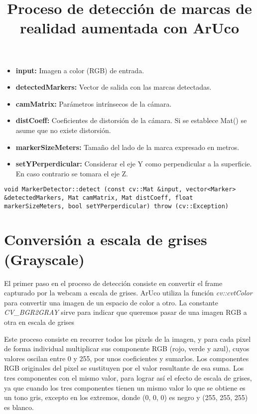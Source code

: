 \documentclass[10pt,a4paper]{article}
\begin{document}
\title{Proceso de detección de marcas de realidad aumentada con ArUco}
\author{}
\date{}
\maketitle


\begin{itemize}
\item \textbf{input:} Imagen a color (RGB) de entrada.
\item \textbf{detectedMarkers:} Vector de salida con las marcas detectadas.
\item \textbf{camMatrix:} Parámetros intrínsecos de la cámara.
\item \textbf{distCoeff:} Coeficientes de distorsión de la cámara. Si se establece Mat() se asume que no existe distorsión.
\item \textbf{markerSizeMeters:} Tamaño del lado de la  marca expresado en metros.
\item \textbf{setYPerperdicular:} Considerar el eje Y como perpendicular a la superficie. En caso contrario se tomara el eje Z.
\end{itemize}


\begin{lstlisting}[style=C++]
void MarkerDetector::detect (const cv::Mat &input, vector<Marker> &detectedMarkers, Mat camMatrix, Mat distCoeff, float markerSizeMeters, bool setYPerperdicular) throw (cv::Exception)
\end{lstlisting}

\section{Conversión a escala de grises (Grayscale)}
El primer paso en el proceso de detección consiste en convertir el frame capturado por la webcam a escala de grises.  ArUco utiliza la función \textit{cv::cvtColor} para convertir una imagen de un espacio de color a otro.  La constante \textit{CV\_BGR2GRAY} sirve para indicar que queremos pasar de una imagen RGB a otra en escala de grises

Este proceso consiste en recorrer todos los pixels de la imagen, y para cada pixel de forma individual multiplicar sus componente RGB (rojo, verde y azul), cuyos valores oscilan entre 0 y 255, por unos coeficientes y sumarlos.
Los componentes RGB originales del pixel se sustituyen por el valor resultante de esa suma. Los tres componentes con el mismo valor, para lograr así el efecto de escala de grises, ya que cuando los tres componentes tienen un mismo valor lo que se obtiene es un tono gris, excepto en los extremos, donde (0, 0, 0) es negro y (255, 255, 255) es blanco.
\end{document}
